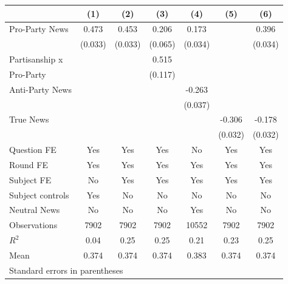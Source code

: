 \begin{tabular}{l*{6}{c}}
\hline\hline
                    &\multicolumn{1}{c}{(1)}&\multicolumn{1}{c}{(2)}&\multicolumn{1}{c}{(3)}&\multicolumn{1}{c}{(4)}&\multicolumn{1}{c}{(5)}&\multicolumn{1}{c}{(6)}\\
\hline
Pro-Party News      &    0.473&    0.453&    0.206&    0.173&         &    0.396\\
                    &  (0.033)&  (0.033)&  (0.065)&  (0.034)&         &  (0.034)\\
Partisanship x      &         &         &    0.515&         &         &         \\
Pro-Party           &         &         &  (0.117)&         &         &         \\
Anti-Party News     &         &         &         &   -0.263&         &         \\
                    &         &         &         &  (0.037)&         &         \\
True News           &         &         &         &         &   -0.306&   -0.178\\
                    &         &         &         &         &  (0.032)&  (0.032)\\
Question FE         &      Yes&      Yes&      Yes&       No&      Yes&      Yes\\
Round FE            &      Yes&      Yes&      Yes&      Yes&      Yes&      Yes\\
Subject FE          &       No&      Yes&      Yes&      Yes&      Yes&      Yes\\
Subject controls    &      Yes&       No&       No&       No&       No&       No\\
Neutral News        &       No&       No&       No&      Yes&       No&       No\\
\hline
Observations        &     7902&     7902&     7902&    10552&     7902&     7902\\
\(R^{2}\)           &     0.04&     0.25&     0.25&     0.21&     0.23&     0.25\\
Mean                &    0.374&    0.374&    0.374&    0.383&    0.374&    0.374\\
\hline\hline
\multicolumn{7}{l}{\footnotesize Standard errors in parentheses}\\
\end{tabular}

